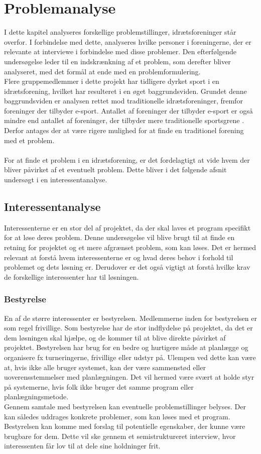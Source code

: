 \chapter{Problemanalyse}\label{ch:ch2label}
I dette kapitel analyseres forskellige problemstillinger, idrætsforeninger står overfor. I forbindelse med dette, analyseres hvilke personer i foreningerne, der er relevante at interviewe i forbindelse med disse problemer. Den efterfølgende undersøgelse leder til en indskrænkning af et problem, som derefter bliver analyseret, med det formål at ende med en problemformulering. \\
Flere gruppemedlemmer i dette projekt har tidligere dyrket sport i en idrætsforening, hvilket har resulteret i en øget baggrundsviden. Grundet denne baggrundsviden er analysen rettet mod traditionelle idrætsforeninger, fremfor foreninger der tilbyder e-sport. Antallet af foreninger der tilbyder e-sport er også mindre end antallet af foreninger, der tilbyder mere traditionelle sportsgrene \citep{e-sport}. Derfor antages der at være rigere mulighed for at finde en traditionel forening med et problem.
\\\\
For at finde et problem i en idrætsforening, er det fordelagtigt at vide hvem der bliver påvirket af et eventuelt problem. Dette bliver i det følgende afsnit undersøgt i en interessentanalyse. 

\section{Interessentanalyse}
Interessenterne er en stor del af projektet, da der skal laves et program specifikt for at løse deres problem. Denne undersøgelse vil blive brugt til at finde en retning for projektet og et mere afgrænset problem, som kan løses. Det er hermed relevant at forstå hvem interessenterne er og hvad deres behov i forhold til problemet og dets løsning er. Derudover er det også vigtigt at forstå hvilke krav de forskellige interessenter har til løsningen.

\subsection*{Bestyrelse}
En af de større interessenter er bestyrelsen. Medlemmerne inden for bestyrelsen er som regel frivillige. Som bestyrelse har de stor indflydelse på projektet, da det er dem løsningen skal hjælpe, og de kommer til at blive direkte påvirket af projektet. Bestyrelsen har brug for en bedre og hurtigere måde at planlægge og organisere fx turneringerne, frivillige eller udstyr på. Ulempen ved dette kan være at, hvis ikke alle bruger systemet, kan der være sammenstød eller uoverensstemmelser med planlægningen. Det vil hermed være svært at holde styr på systemerne, hvis folk ikke bruger det samme program eller planlægningsmetode.\\ 
Gennem samtale med bestyrelsen kan eventuelle problemstillinger belyses. Der kan således uddrages konkrete problemer, som kan løses med et program. Bestyrelsen kan komme med forslag til potentielle egenskaber, der kunne være brugbare for dem. Dette vil ske gennem et semistruktureret interview, hvor interessenten får lov til at dele sine holdninger frit.

